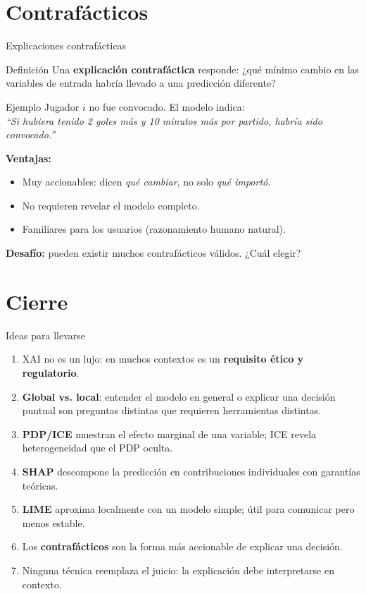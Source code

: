 \documentclass[aspectratio=169]{beamer}
\begin{document}
\section{Contrafácticos}

\begin{frame}{Explicaciones contrafácticas}
  \begin{block}{Definición}
    Una \textbf{explicación contrafáctica} responde: ¿qué mínimo cambio en las variables de entrada habría llevado a una predicción diferente?
  \end{block}

  \bigskip
  \begin{exampleblock}{Ejemplo}
    Jugador $i$ no fue convocado. El modelo indica:\\
    \textit{``Si hubiera tenido 2 goles más y 10 minutos más por partido, habría sido convocado.''}
  \end{exampleblock}

  \bigskip
  \textbf{Ventajas:}
  \begin{itemize}
    \item Muy accionables: dicen \textit{qué cambiar}, no solo \textit{qué importó}.
    \item No requieren revelar el modelo completo.
    \item Familiares para los usuarios (razonamiento humano natural).
  \end{itemize}

  \bigskip
  \textbf{Desafío:} pueden existir muchos contrafácticos válidos. ¿Cuál elegir?
\end{frame}

\section{Cierre}

\begin{frame}{Ideas para llevarse}
  \begin{enumerate}
    \item XAI no es un lujo: en muchos contextos es un \textbf{requisito ético y regulatorio}.
    \item \textbf{Global vs. local}: entender el modelo en general o explicar una decisión puntual son preguntas distintas que requieren herramientas distintas.
    \item \textbf{PDP/ICE} muestran el efecto marginal de una variable; ICE revela heterogeneidad que el PDP oculta.
    \item \textbf{SHAP} descompone la predicción en contribuciones individuales con garantías teóricas.
    \item \textbf{LIME} aproxima localmente con un modelo simple; útil para comunicar pero menos estable.
    \item Los \textbf{contrafácticos} son la forma más accionable de explicar una decisión.
    \item Ninguna técnica reemplaza el juicio: la explicación debe interpretarse en contexto.
  \end{enumerate}
\end{frame}
\end{document}
